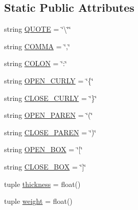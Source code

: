 \subsection*{Static Public Attributes}
\begin{DoxyCompactItemize}
\item 
string \hyperlink{class_bridges_1_1_link_visualizer_1_1_link_visualizer_af9caa1115c837b7105e589bbb191f700}{Q\+U\+O\+T\+E} = \char`\"{}\textbackslash{}\char`\"{}\char`\"{}
\item 
string \hyperlink{class_bridges_1_1_link_visualizer_1_1_link_visualizer_a06eed38f9cc6a6ce26811920566264a7}{C\+O\+M\+M\+A} = \char`\"{},\char`\"{}
\item 
string \hyperlink{class_bridges_1_1_link_visualizer_1_1_link_visualizer_ab03eabf865fc9fdbb0a3eb776753bf01}{C\+O\+L\+O\+N} = \char`\"{}\+:\char`\"{}
\item 
string \hyperlink{class_bridges_1_1_link_visualizer_1_1_link_visualizer_a709c179dbb478787700f42cf582aece4}{O\+P\+E\+N\+\_\+\+C\+U\+R\+L\+Y} = \char`\"{}\{\char`\"{}
\item 
string \hyperlink{class_bridges_1_1_link_visualizer_1_1_link_visualizer_a1f476e1b800cb77432e5995fbbddfc88}{C\+L\+O\+S\+E\+\_\+\+C\+U\+R\+L\+Y} = \char`\"{}\}\char`\"{}
\item 
string \hyperlink{class_bridges_1_1_link_visualizer_1_1_link_visualizer_a0b650ad19deb09dd639ba39b2a3326f4}{O\+P\+E\+N\+\_\+\+P\+A\+R\+E\+N} = \char`\"{}(\char`\"{}
\item 
string \hyperlink{class_bridges_1_1_link_visualizer_1_1_link_visualizer_a207f021a22c07cfdc824a6460a7dacff}{C\+L\+O\+S\+E\+\_\+\+P\+A\+R\+E\+N} = \char`\"{})\char`\"{}
\item 
string \hyperlink{class_bridges_1_1_link_visualizer_1_1_link_visualizer_a5db5696ce6da65ae21b062871e143b4e}{O\+P\+E\+N\+\_\+\+B\+O\+X} = \char`\"{}\mbox{[}\char`\"{}
\item 
string \hyperlink{class_bridges_1_1_link_visualizer_1_1_link_visualizer_a2f11bc69b583132c6b55bc3642430eab}{C\+L\+O\+S\+E\+\_\+\+B\+O\+X} = \char`\"{}\mbox{]}\char`\"{}
\item 
tuple \hyperlink{class_bridges_1_1_link_visualizer_1_1_link_visualizer_a9755ab11c1bd849350871fe031cb6c8e}{thickness} = float()
\item 
tuple \hyperlink{class_bridges_1_1_link_visualizer_1_1_link_visualizer_acb4588c51b64630c064a36f023e967ca}{weight} = float()
\end{DoxyCompactItemize}


